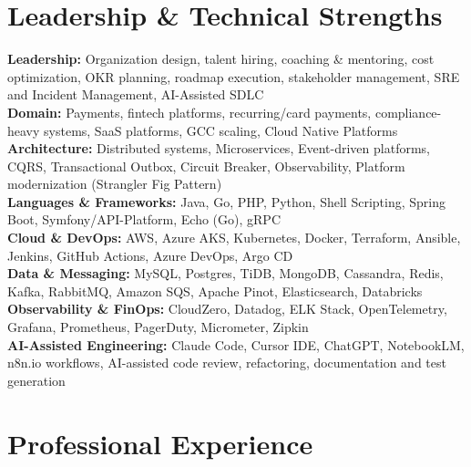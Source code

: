 \documentclass[11pt,a4paper]{article}
\begin{document}
\section*{Leadership \& Technical Strengths}
\textbf{Leadership:} Organization design, talent hiring, coaching \& mentoring, cost optimization, OKR planning, roadmap execution, stakeholder management, SRE and Incident Management, AI-Assisted SDLC\\
\textbf{Domain:} Payments, fintech platforms, recurring/card payments, compliance-heavy systems, SaaS platforms, GCC scaling, Cloud Native Platforms\\
\textbf{Architecture:} Distributed systems, Microservices, Event-driven platforms, CQRS, Transactional Outbox, Circuit Breaker, Observability, Platform modernization (Strangler Fig Pattern)\\
\textbf{Languages \& Frameworks:} Java, Go, PHP, Python, Shell Scripting, Spring Boot, Symfony/API-Platform, Echo (Go), gRPC\\
\textbf{Cloud \& DevOps:} AWS, Azure AKS, Kubernetes, Docker, Terraform, Ansible, Jenkins, GitHub Actions, Azure DevOps, Argo CD\\
\textbf{Data \& Messaging:} MySQL, Postgres, TiDB, MongoDB, Cassandra, Redis, Kafka, RabbitMQ, Amazon SQS, Apache Pinot, Elasticsearch, Databricks\\
\textbf{Observability \& FinOps:} CloudZero, Datadog, ELK Stack, OpenTelemetry, Grafana, Prometheus, PagerDuty, Micrometer, Zipkin\\
\textbf{AI-Assisted Engineering:} Claude Code, Cursor IDE, ChatGPT, NotebookLM, n8n.io workflows, AI-assisted code review, refactoring, documentation and test generation

\section*{Professional Experience}
\end{document}
